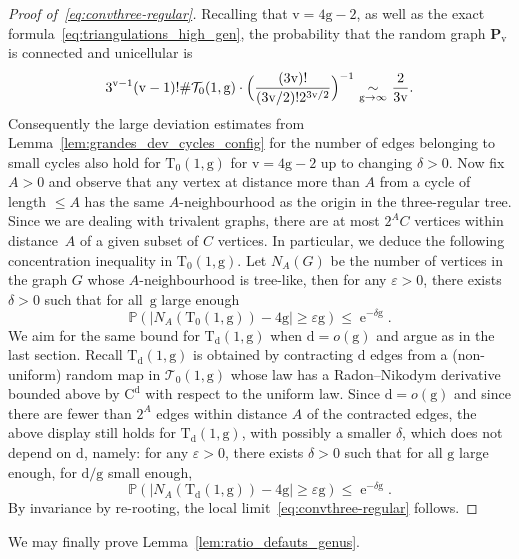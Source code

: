 \documentclass[11pt]{article}
\theoremstyle{plain}
\theoremstyle{definition}
\theoremstyle{remark}
\renewcommand{\P}{\mathbb{P}}
\newcommand{\e}{\operatorname{e}}
\newcommand{\Triv}{\mathrm{T}}
\newcommand{\defect}{\mathrm{d}}
\newcommand{\gen}{\mathrm{g}}
\newcommand{\ver}{\mathrm{v}}
\newcommand{\equi}[1][n]{\,\mathop{\sim}^{}_{#1 \to \infty}\,}
\begin{document}
\begin{proof}[Proof of~\eqref{eq:convthree-regular}]
Recalling that $\ver=4\gen-2$, as well as the exact formula~\eqref{eq:triangulations_high_gen}, the probability that the random graph $\mathbf{P}_{\ver}$ is connected and unicellular is
\[
{3^{\ver-1} (\ver-1)! \#\mathcal{T}_{0}(1,\gen)} \cdot \Bigl({ \frac{(3\ver)!}{(3\ver/2)! 2^{3\ver/2}}} \Bigr)^{-1}
\equi[\gen] \frac{2}{3\ver}.
\]
Consequently the large deviation estimates from Lemma~\ref{lem:grandes_dev_cycles_config} for the number of edges belonging to small cycles also hold for $ \Triv_{0}(1, \gen)$ for $\ver = 4 \gen-2$ up to changing $\delta >0$.
Now fix $A>0$ and observe that any vertex at distance more than $ A$ from a cycle of length $ \leq A$ has the same $A$-neighbourhood as the origin in the three-regular tree. Since we are dealing with trivalent graphs, there are at most $ 2^{A}C$ vertices within distance~$A$ of a given subset of $C$ vertices. In particular, we deduce the following concentration inequality in $ \Triv_{ 0}(1, \gen)$. Let $ N_{A}(G)$ be the number of vertices in the graph $G$ whose $A$-neighbourhood is tree-like, then for any $\varepsilon>0$, there exists $\delta >0$ such that for all~$\gen$ large enough
\[
\P(|N_{A}(\Triv_{ 0}(1, \gen)) - 4\gen| \geq \varepsilon \gen) \leq \e^{-\delta \gen}.
\]
We aim for the same bound for $\Triv_{\defect}(1, \gen)$ when $ \defect = o(\gen)$ and argue as in the last section. Recall $ \Triv_{ \defect}(1, \gen)$ is obtained by contracting $ \defect$ edges from a (non-uniform) random map in $\mathcal{T}_0(1, \gen)$ whose law has a Radon--Nikodym derivative bounded above by $\mathrm{C}^{ \defect}$ with respect to the uniform law. Since $ \defect = o(\gen)$ and since there are fewer than $2^{A}$ edges within distance $A$ of the contracted edges, the above display still holds for $ \Triv_{ \defect}(1, \gen)$, with possibly a smaller $\delta$, which does not depend on $\defect$, namely: for any $\varepsilon>0$, there exists $\delta >0$ such that for all $\gen$ large enough, for $\defect/\gen$ small enough,
\begin{equation}\label{eq:grandes_dev_high_gen}
\P(|N_{A}(\Triv_{\defect}(1, \gen)) - 4\gen| \geq \varepsilon \gen) \leq \e^{-\delta \gen}.
\end{equation}
By invariance by re-rooting, the local limit~\eqref{eq:convthree-regular} follows.
\end{proof}

We may finally prove Lemma~\ref{lem:ratio_defauts_genus}.
\end{document}
